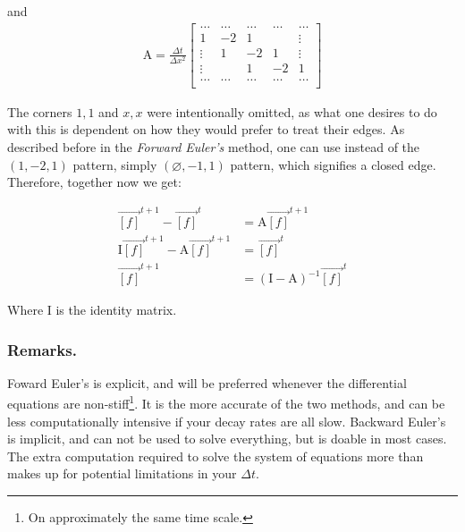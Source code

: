 and 
\begin{align}
\mathrm{A} = \frac{\Delta t}{\Delta x^2}
\begin{bmatrix} %
\dots       &   \dots       & \dots     &   \dots    &   \dots   \\
1           &   -2          & 1         &            &   \vdots    \\
\vdots      &   1           & -2        &   1        &   \vdots   \\   
\vdots      &               & 1         &   -2       &   1    \\
\dots       &   \dots       & \dots     &   \dots    &   \dots    \\
\end{bmatrix}
\end{align}

The corners $1,1$ and $x,x$ were intentionally omitted, as what one desires to do with this is dependent on how they would prefer to treat their edges. As described before in the \textit{Forward Euler's} method, one can use instead of the $(1,-2,1)$ pattern, simply $(\varnothing,-1,1)$ pattern, which signifies a closed edge. Therefore, together now we get: 

\begin{equation} \label{diff7}
\begin{split}
\vec{[f]}^{t+1} - \vec{[f]}^{t} & = \mathrm{A} \vec{[f]}^{t+1} \\
\mathrm{I}\vec{[f]}^{t+1} - \mathrm{A}\vec{[f]}^{t+1} & = \vec{[f]}^{t} \\
\vec{[f]}^{t+1} & = (\mathrm{I} - \mathrm{A})^{-1}\vec{[f]}^{t}
\end{split}
\end{equation}

Where I is the identity matrix. 

\subsubsection{Remarks.} 
Foward Euler's is explicit, and will be preferred whenever the differential equations are non-stiff\footnote{On approximately the same time scale.}. It is the more accurate of the two methods, and can be less computationally intensive if your decay rates are all slow. Backward Euler's is implicit, and can not be used to solve everything, but is doable in most cases. The extra computation required to solve the system of equations more than makes up for potential limitations in your $\Delta t$. 

